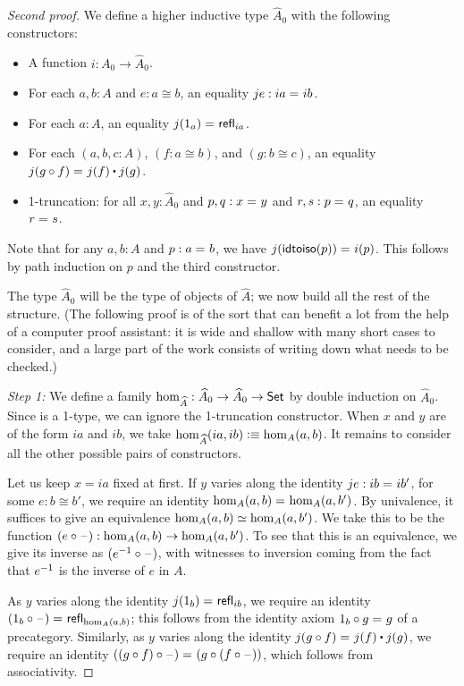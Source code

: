 \begin{proof}[Second proof]
  We define a higher inductive type $\widehat A_0$ with the following constructors:
  \begin{itemize}
  \item A function $i:A_0 \to \widehat A_0$.
  \item For each $a,b:A$ and $e:a\cong b$, an equality $je:ia =_{} ib$.
  \item For each $a:A$, an equality $j(1_a) =_{} \mathsf{refl}_{ia}$.
  \item For each $(a,b,c:A)$, $(f:a\cong b)$, and $(g:b\cong c)$, an equality $\id{j(g \circ f)}{j(f)\ct j(g)}$.
  \item 1-truncation: for all $x,y:\widehat A_0$ and $p,q:x =_{} y$ and $r,s:p =_{} q$, an equality $r =_{} s$.
  \end{itemize}
  Note that for any $a,b:A$ and $p:a =_{} b$, we have $j(\mathsf{idtoiso}(p)) =_{} {i}\mathopen{}\left({p}\right)\mathclose{}$.
  This follows by path induction on $p$ and the third constructor.

  The type $\widehat A_0$ will be the type of objects of $\widehat A$; we now build all the rest of the structure.
  (The following proof is of the sort that can benefit a lot from the help of a computer proof assistant: it is wide and shallow with many short cases to consider, and a large part of the work consists of writing down what needs to be checked.)

  \mentalpause

  \emph{Step 1:} We define a family $\hom_{\widehat A}:\widehat A_0\to \widehat A_0 \to \mathsf{Set}$ by double induction on $\widehat A_0$.
  Since \set is a 1-type, we can ignore the 1-truncation constructor.
  When $x$ and $y$ are of the form $ia$ and $ib$, we take $\hom_{\widehat A}(ia,ib) \vcentcolon\equiv \hom_A(a,b)$.
  It remains to consider all the other possible pairs of constructors.

  Let us keep $x=ia$ fixed at first.
  If $y$ varies along the identity $je:ib =_{} ib'$, for some $e:b\cong b'$, we require an identity $\hom_A(a,b) =_{} \hom_A(a,b')$.
  By univalence, it suffices to give an equivalence $\hom_A(a,b) \simeq \hom_A(a,b')$.
  We take this to be the function $(e\circ \mathord{\hspace{1pt}\text{--}\hspace{1pt}} ):\hom_A(a,b)\to \hom_A(a,b')$.
  To see that this is an equivalence, we give its inverse as $({e}^{-1}\circ \mathord{\hspace{1pt}\text{--}\hspace{1pt}} )$, with witnesses to inversion coming from the fact that ${e}^{-1}$ is the inverse of $e$ in $A$.

  As $y$ varies along the identity $j(1_b) =_{} \mathsf{refl}_{ib}$, we require an identity $(1_b\circ \mathord{\hspace{1pt}\text{--}\hspace{1pt}} ) =_{} \mathsf{refl}_{\hom_A(a,b)}$; this follows from the identity axiom $1_b\circ g =_{} g$ of a precategory.
  Similarly, as $y$ varies along the identity $\id{j(g\circ f)}{j(f)\ct j(g)}$, we require an identity $((g\circ f)\circ \mathord{\hspace{1pt}\text{--}\hspace{1pt}} ) =_{} (g\circ (f\circ \mathord{\hspace{1pt}\text{--}\hspace{1pt}} ))$, which follows from associativity.


\end{proof}
